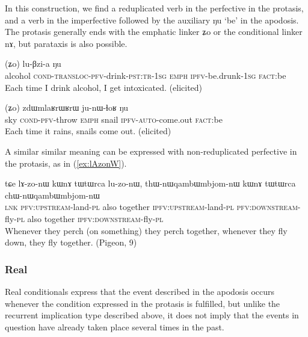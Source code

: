 \documentclass[oldfontcommands,oneside,a4paper,11pt]{article}
\newcommand{\ipa}[1]{{\phon \mbox{#1}}} %
\newcommand{\refb}[1]{(\ref{#1})}
\begin{document}
In this construction, we find a reduplicated verb in the perfective  in the protasis, and a verb in the imperfective followed by the auxiliary \ipa{ŋu} `be'   in the apodosis. The protasis generally ends with the emphatic linker \ipa{ʑo} or the conditional linker \ipa{nɤ}, but parataxis is also possible.

     \begin{exe}
   \ex \label{ex:CWCkAtshita}
   \gll
[\ipa{cʰa}   	\textbf{\ipa{ɕɯ-ɕ-kɤ-tsʰi-t-a}}]   	(\ipa{ʑo})   	\ipa{lu-βzi-a}   	\ipa{ŋu}   \\
alcohol \textsc{cond-transloc-pfv}-drink-\textsc{pst:tr-1sg} \textsc{emph} \textsc{ipfv}-be.drunk-\textsc{1sg} \textsc{fact}:be\\
\glt Each time I drink alcohol, I get intoxicated. (elicited)
\end{exe}

     \begin{exe}
   \ex \label{ex:tWmW.kWkAlAt}
   \gll
[\ipa{tɯmɯ}   \textbf{	\ipa{kɯ-kɤ-lɤt}}]   	(\ipa{ʑo})   	\ipa{zdɯmlaʁrɯʁrɯ}   	\ipa{ju-nɯ-ɬoʁ}   	\ipa{ŋu}   \\
sky \textsc{cond-pfv}-throw \textsc{emph} snail \textsc{ipfv-auto}-come.out \textsc{fact}:be\\
\glt Each time it rains,  snails come out. (elicited)
\end{exe}

A similar similar meaning can be expressed with non-reduplicated perfective in the protasis, as in \refb{ex:lAzonW}.

     \begin{exe}
\ex \label{ex:lAzonW}
\gll
\ipa{tɕe} 	\ipa{lɤ-zo-nɯ} 	\ipa{kɯnɤ} 	\ipa{tɯtɯrca} 	\ipa{lu-zo-nɯ,} 	\ipa{thɯ-nɯqambɯmbjom-nɯ} 	\ipa{kɯnɤ} 	\ipa{tɯtɯrca} 	\ipa{chɯ-nɯqambɯmbjom-nɯ}  \\
\textsc{lnk} \textsc{pfv:upstream}-land-\textsc{pl} also together \textsc{ipfv:upstream}-land-\textsc{pl} \textsc{pfv:downstream}-fly-\textsc{pl} also together \textsc{ipfv:downstream}-fly-\textsc{pl}  \\
\glt Whenever they perch (on something) they perch together, whenever they fly down, they fly together. (Pigeon, 9)
\end{exe}

\subsubsection{Real} \label{sec:real.conditional}
Real conditionals express that the event described in the apodosis occurs whenever the condition expressed in the protasis is fulfilled, but unlike the recurrent implication type described above, it does not imply that the events in question have already taken place several times in the past.
\end{document}
